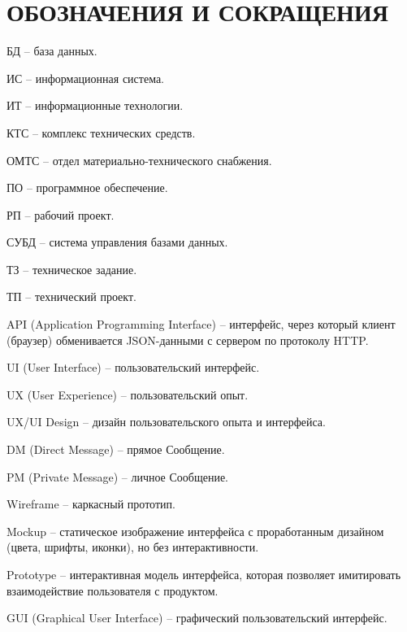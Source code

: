 \section*{ОБОЗНАЧЕНИЯ И СОКРАЩЕНИЯ}

БД -- база данных.

ИС -- информационная система.

ИТ -- информационные технологии. 

КТС -- комплекс технических средств.

ОМТС -- отдел материально-технического снабжения. 

ПО -- программное обеспечение.

РП -- рабочий проект.

СУБД -- система управления базами данных.

ТЗ -- техническое задание.

ТП -- технический проект.

API (Application Programming Interface) -- интерфейс, через который клиент (браузер) обменивается JSON-данными с сервером по протоколу HTTP.

UI (User Interface) – пользовательский интерфейс. 

UX (User Experience) – пользовательский опыт. 

UX/UI Design – дизайн пользовательского опыта и интерфейса. 

DM (Direct Message) – прямое Сообщение. 

PM (Private Message) – личное Сообщение. 

Wireframe – каркасный прототип. 

Mockup – статическое изображение интерфейса с проработанным дизайном (цвета, шрифты, иконки), но без интерактивности.

Prototype – интерактивная модель интерфейса, которая позволяет имитировать взаимодействие пользователя с продуктом. 

GUI (Graphical User Interface) – графический пользовательский интерфейс. 